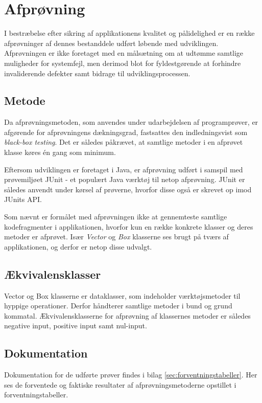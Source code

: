 \section{Afprøvning}
\label{sec:afproevning}
I bestræbelse efter sikring af applikationens kvalitet og pålidelighed er en række afprøvninger af dennes bestanddele udført løbende med udviklingen. Afprøvningen er ikke foretaget med en målsætning om at udtømme samtlige muligheder for systemfejl, men derimod blot for fyldestgørende at forhindre invaliderende defekter samt bidrage til udviklingsprocessen.

\subsection{Metode}
\label{subsec:metode}
Da afprøvningsmetoden, som anvendes under udarbejdelsen af programprøver, er afgørende for afprøvningens dækningsgrad, fastsattes den indledningsvist som \emph{black-box testing}. Det er således påkrævet, at samtlige metoder i en afprøvet klasse køres én gang som minimum.

Eftersom udviklingen er foretaget i Java, er afprøvning udført i samspil med prøvemiljøet JUnit - et populært Java værktøj til netop afprøvning. JUnit er således anvendt under kørsel af prøverne, hvorfor disse også er skrevet op imod JUnits API.

Som nævnt er formålet med afprøvningen ikke at gennemteste samtlige kodefragmenter i applikationen, hvorfor kun en række konkrete klasser og deres metoder er afprøvet. Især \emph{Vector} og \emph{Box} klasserne ses brugt på tværs af applikationen, og derfor er netop disse udvalgt.

\subsection{Ækvivalensklasser}
\label{subsec:aekvivalensklasser}
Vector og Box klasserne er dataklasser, som indeholder værktøjsmetoder til hyppige operationer. Derfor håndterer samtlige metoder i bund og grund kommatal. Ækvivalensklasserne for afprøvning af klassernes metoder er således negative input, positive input samt nul-input.

\subsection{Dokumentation}
\label{subsec:dokumentation}
Dokumentation for de udførte prøver findes i bilag \ref{sec:forventningstabeller}. Her ses de forventede og faktiske resultater af afprøvningsmetoderne opstillet i forventningstabeller.